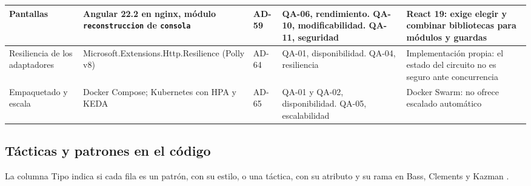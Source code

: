 \documentclass[11pt,a4paper]{article}
\begin{document}
{\begin{longtable}{|P{2.5cm}|P{2.9cm}|P{1.2cm}|P{4.2cm}|P{3.4cm}|}
  Pantallas & Angular 22.2 en nginx, módulo \texttt{reconstruccion} de \texttt{consola} & AD-59 & QA-06, rendimiento. QA-10, modificabilidad. QA-11, seguridad & React 19: exige elegir y combinar bibliotecas para módulos y guardas \\ \hline
  Resiliencia de los adaptadores & Microsoft.\allowbreak Extensions.\allowbreak Http.\allowbreak Resilience (Polly v8) & AD-64 & QA-01, disponibilidad. QA-04, resiliencia & Implementación propia: el estado del circuito no es seguro ante concurrencia \\ \hline
  Empaquetado y escala & Docker Compose; Kubernetes con HPA y KEDA & AD-65 & QA-01 y QA-02, disponibilidad. QA-05, escalabilidad & Docker Swarm: no ofrece escalado automático \\ \hline
\end{longtable}
}

\subsection{Tácticas y patrones en el código}

La columna Tipo indica si cada fila es un patrón, con su estilo, o una táctica, con su atributo y su rama en Bass,
Clements y Kazman \cite{bass}.
\end{document}

